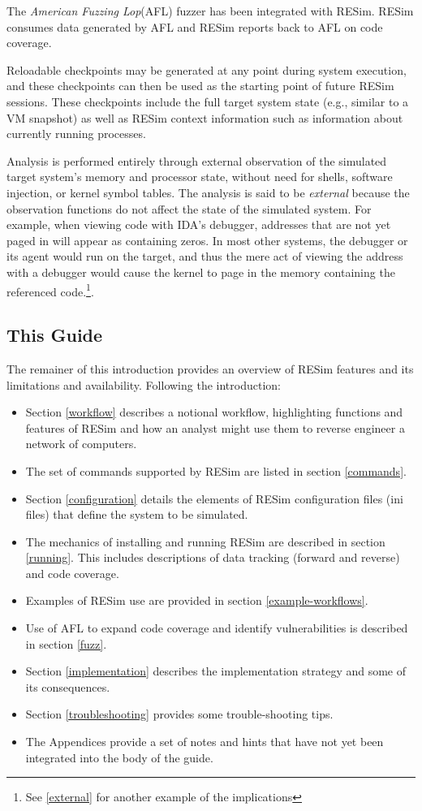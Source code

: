 \documentclass[titlepage]{article}
\begin{document}
The \textit{American Fuzzing Lop}(AFL) fuzzer has been integrated with RESim. RESim consumes data generated by AFL and RESim reports
back to AFL on code coverage.

Reloadable checkpoints may be generated at any point during system execution, and these checkpoints can then be used as the starting point of future RESim 
sessions.  These checkpoints include the full target system state (e.g., similar to a VM snapshot) as well as RESim context information such as
information about currently running processes.
  
Analysis is performed entirely through external observation of the simulated target system's memory and processor state, 
without need for shells, software injection, or kernel symbol tables.   The analysis is said to be \textit{external} because the observation functions do
not affect the state of the simulated system.  For example, when viewing code with IDA's debugger, addresses that are not yet paged in will appear as containing zeros.
In most other systems, the debugger or its agent would run on the target, and thus the mere act of viewing the address with a debugger 
would cause the kernel to page
in the memory containing the referenced code.\footnote{See \ref{external} for another example of the implications}.

\subsection{This Guide}
The remainer of this introduction provides an overview of RESim features and its limitations and availability.  Following the introduction:
\begin{itemize}
\item Section \ref{workflow} 
describes a notional workflow, highlighting functions and features of RESim and how an analyst might use them to reverse engineer a 
network of computers.  
\item The set of commands supported by RESim are listed in section \ref{commands}.  
\item Section \ref{configuration} details
the elements of RESim configuration files (ini files) that define the system to be simulated.  
\item The mechanics of installing and running 
RESim are described in section \ref{running}.  This includes descriptions of data tracking (forward and reverse) and code coverage. 
\item Examples of RESim use are provided in section \ref{example-workflows}.  
\item Use of AFL to expand code coverage and identify vulnerabilities is described in section \ref{fuzz}.
\item Section \ref{implementation} describes the implementation strategy and some of its consequences.
\item Section \ref{troubleshooting} provides some trouble-shooting tips.
\item The Appendices provide a set of notes and hints that have not yet been integrated into the body of the guide.
\end{itemize}
\end{document}
